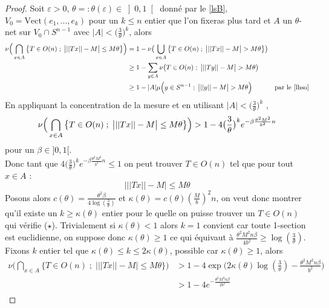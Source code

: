 \documentclass[12pt]{article}
\theoremstyle{definition}
\begin{document}
\begin{proof}
	Soit $\varepsilon>0$, $\theta=:\theta(\varepsilon)\in\left]0,1\right[$ donné par le \cref{lsB}, $V_0 = \text{Vect}(e_1,...,e_k)$ pour un $k\leq n$ entier que l'on fixeras plus tard et $A$ un $\theta$-net sur $V_0\cap S^{n-1}$ avec $|A|< \big(\frac{3}{\theta}\big)^k$, alors 
	\begin{align*}
	\nu\Big(\bigcap_{x\in A}\big\{T\in O(n)\; ; \;  \big| ||Tx||-M \big|\leq M\theta\big\}\Big)& = 1-\nu\big(\bigcup_{x\in A}\big\{T\in O(n)\; ; \; \big| ||Tx||-M \big|>M\theta\big\}\big)& \\
	& \geq 1-\sum_{y\in A}\nu\big(T\in O(n)\; ; \; \big| ||Ty||-M \big|>M\theta\big)\\
	& \geq 1 - |A|\mu\Big(y\in S^{n-1}\; ;\; \big| ||y||-M \big|>M\theta\Big) & \text{par le \cref{lhso}}
	\end{align*} 
	En appliquant la concentration de la mesure et en utilisant $|A|< \big(\frac{3}{\theta}\big)^k$ ,
	\begin{equation*}
	\nu\Big(\bigcap_{x\in A}\big\{T\in O(n)\; ; \;  \big| ||Tx||-M \big|\leq M\theta\big\}\Big)> 1 - 4\big(\frac{3}{\theta}\big)^k e^{-\beta\frac{\theta^2M^2}{b^2}n}\\
	\end{equation*}
	pour un $\beta\in]0,1[$. \\
	Donc tant que $4\big(\frac{3}{\theta}\big)^k e^{-\beta\frac{\theta^2M^2}{b^2}n}\leq 1$ on peut trouver $T\in O(n)$ tel que pour tout $x\in A$ :
	\begin{equation*}\tag{$\star$}
	\Big| ||Tx||- M \Big|\leq M\theta
	\end{equation*}
	Posons alors $c(\theta)=\frac{\theta^2 \beta}{4\log\left(\frac{3}{\theta}\right)}$ et $\kappa(\theta)=c(\theta)\left(\frac{M}{b}\right)^2 n$, on veut donc montrer qu'il existe un $k\geq \kappa(\theta)$ entier pour le quelle on puisse trouver un $T\in O(n)$ qui vérifie ($\star$). Trivialement si $\kappa(\theta)<1$ alors $k=1$ convient car toute 1-section est euclidienne, on suppose donc $\kappa(\theta)\geq 1$ ce qui équivaut à $\frac{\theta^2M^2n\beta}{4b^2}\geq \log(\frac{3}{\theta})$. Fixons $k$ entier tel que $\kappa(\theta)\leq k\leq 2\kappa(\theta)$, possible car $\kappa(\theta)\geq 1$, alors
	\begin{align*}
	\nu\Big(\bigcap_{x\in A}\big\{T\in O(n)\; ; \;  \big| ||Tx||-M \big|\leq M\theta\big\}\Big)
	& > 1 - 4 \exp\big(2\kappa(\theta)\log(\frac{3}{\theta})-\frac{\theta^2M^2n\beta}{b^2}\big)\\
	& > 1 -  4 e^{-\frac{\theta^2M^2n\beta}{2b^2}}\\

\end{align*}
\end{proof}
\end{document}

